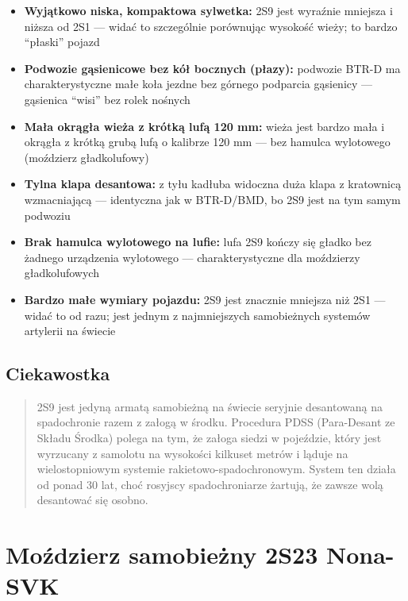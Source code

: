 \documentclass[12pt,oneside]{book}
\providecommand{\tightlist}{%
  \setlength{\itemsep}{0pt}\setlength{\parskip}{0pt}}
\begin{document}
\begin{itemize}
\tightlist
\item
  \textbf{Wyjątkowo niska, kompaktowa sylwetka:} 2S9 jest wyraźnie
  mniejsza i niższa od 2S1 --- widać to szczególnie porównując wysokość
  wieży; to bardzo ``płaski'' pojazd
\item
  \textbf{Podwozie gąsienicowe bez kół bocznych (płazy):} podwozie BTR-D
  ma charakterystyczne małe koła jezdne bez górnego podparcia gąsienicy
  --- gąsienica ``wisi'' bez rolek nośnych
\item
  \textbf{Mała okrągła wieża z krótką lufą 120 mm:} wieża jest bardzo
  mała i okrągła z krótką grubą lufą o kalibrze 120 mm --- bez hamulca
  wylotowego (moździerz gładkolufowy)
\item
  \textbf{Tylna klapa desantowa:} z tyłu kadłuba widoczna duża klapa z
  kratownicą wzmacniającą --- identyczna jak w BTR-D/BMD, bo 2S9 jest na
  tym samym podwoziu
\item
  \textbf{Brak hamulca wylotowego na lufie:} lufa 2S9 kończy się gładko
  bez żadnego urządzenia wylotowego --- charakterystyczne dla moździerzy
  gładkolufowych
\item
  \textbf{Bardzo małe wymiary pojazdu:} 2S9 jest znacznie mniejsza niż
  2S1 --- widać to od razu; jest jednym z najmniejszych samobieżnych
  systemów artylerii na świecie
\end{itemize}

\subsection{Ciekawostka}\label{ciekawostka-22}

\begin{quote}
2S9 jest jedyną armatą samobieżną na świecie seryjnie desantowaną na
spadochronie razem z załogą w środku. Procedura PDSS (Para-Desant ze
Składu Środka) polega na tym, że załoga siedzi w pojeździe, który jest
wyrzucany z samolotu na wysokości kilkuset metrów i ląduje na
wielostopniowym systemie rakietowo-spadochronowym. System ten działa od
ponad 30 lat, choć rosyjscy spadochroniarze żartują, że zawsze wolą
desantować się osobno.
\end{quote}

\section{Moździerz samobieżny 2S23
Nona-SVK}\label{moux17adzierz-samobieux17cny-2s23-nona-svk}
\end{document}
